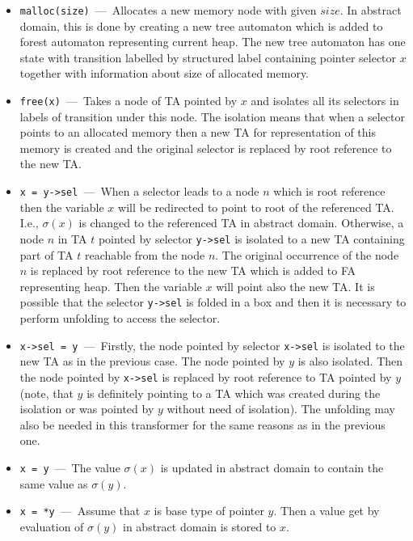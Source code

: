 \documentclass[a4paper, 12pt]{article}
\begin{document}
\begin{itemize}
	\item \texttt{malloc(size)} \,---\, Allocates a new memory node with given $size$.
		In abstract domain, this is done by creating a new tree automaton which
		is added to forest automaton representing current heap.
		The new tree automaton has one state with transition labelled by
		structured label containing pointer selector $x$ together with information
		about size of allocated memory.
	\item \texttt{free(x)} \,---\, Takes a node of TA pointed by $x$ and isolates all
		its selectors in labels of transition under this node.
		The isolation means that when a selector points to an allocated memory
		then a new TA for representation of this memory is created and
		the original selector is replaced by root reference to the new TA.
	\item \texttt{x = y->sel} \,---\, When a selector leads to a node $n$ which is root
		reference then the variable $x$ will be redirected to point to
		root of the referenced TA.
		I.e., $\sigma(x)$ is changed to the referenced TA in abstract domain.
		Otherwise, a node $n$ in TA $t$ pointed by selector \texttt{y->sel} is isolated to a new TA
		containing part of TA $t$ reachable from the node $n$.
		The original occurrence of the node $n$ is replaced by root reference
		to the new TA which is added to FA representing heap.
		Then the variable $x$ will point also the new TA.
		It is possible that the selector \texttt{y->sel} is folded
		in a box and then it is necessary to perform unfolding
		to access the selector.
		
	\item \texttt{x->sel = y} \,---\, Firstly, the node pointed by selector \texttt{x->sel}
		is isolated to the new TA as in the previous case.
		The node pointed by $y$ is also isolated. 
		Then the node pointed by \texttt{x->sel} is replaced
		by root reference to TA pointed by $y$ (note, that
		$y$ is definitely pointing to a TA which was created
		during the isolation or was pointed by $y$ without need of isolation).
		The unfolding may also be needed in this transformer for
		the same reasons as in the previous one.
	
	\item \texttt{x = y} \,---\, The value $\sigma(x)$ is updated in abstract
		domain to contain the same value as $\sigma(y)$.

	\item \texttt{x = *y} \,---\, Assume that $x$ is base type of pointer $y$.
		Then a value get by evaluation of $\sigma(y)$ in abstract domain is
		stored to $x$.
	
\end{itemize}
\end{document}

